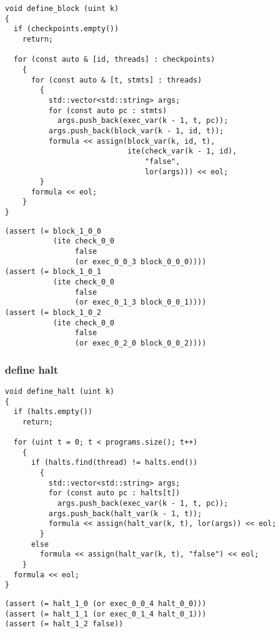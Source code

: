 \begin{lstlisting}[style=c++]
void define_block (uint k)
{
  if (checkpoints.empty())
    return;

  for (const auto & [id, threads] : checkpoints)
    {
      for (const auto & [t, stmts] : threads)
        {
          std::vector<std::string> args;
          for (const auto pc : stmts)
            args.push_back(exec_var(k - 1, t, pc));
          args.push_back(block_var(k - 1, id, t));
          formula << assign(block_var(k, id, t),
                            ite(check_var(k - 1, id),
                                "false",
                                lor(args))) << eol;
        }
      formula << eol;
    }
}
\end{lstlisting}

\begin{lstlisting}[language=SMTLib]
(assert (= block_1_0_0
           (ite check_0_0
                false
                (or exec_0_0_3 block_0_0_0))))
(assert (= block_1_0_1
           (ite check_0_0
                false
                (or exec_0_1_3 block_0_0_1))))
(assert (= block_1_0_2
           (ite check_0_0
                false
                (or exec_0_2_0 block_0_0_2))))
\end{lstlisting}

\subsubsection{define halt}

\begin{lstlisting}[style=c++]
void define_halt (uint k)
{
  if (halts.empty())
    return;

  for (uint t = 0; t < programs.size(); t++)
    {
      if (halts.find(thread) != halts.end())
        {
          std::vector<std::string> args;
          for (const auto pc : halts[t])
            args.push_back(exec_var(k - 1, t, pc));
          args.push_back(halt_var(k - 1, t));
          formula << assign(halt_var(k, t), lor(args)) << eol;
        }
      else
        formula << assign(halt_var(k, t), "false") << eol;
    }
  formula << eol;
}
\end{lstlisting}

\begin{lstlisting}[language=SMTLib]
(assert (= halt_1_0 (or exec_0_0_4 halt_0_0)))
(assert (= halt_1_1 (or exec_0_1_4 halt_0_1)))
(assert (= halt_1_2 false))
\end{lstlisting}

